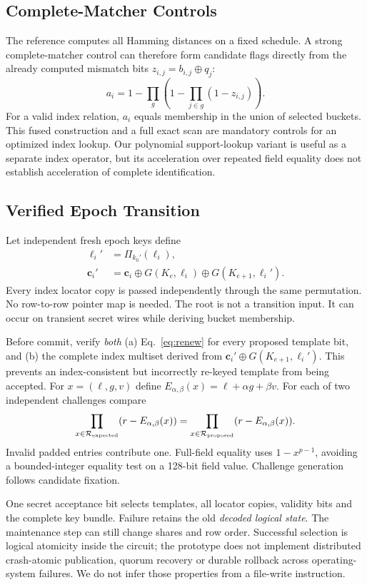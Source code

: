 \documentclass[journal]{IEEEtran}
\begin{document}
\subsection{Complete-Matcher Controls}
The reference computes all Hamming distances on a fixed schedule. A strong complete-matcher control can therefore form candidate flags directly from the already computed mismatch bits $z_{i,j}=b_{i,j}\oplus q_j$:
\[
a_i=1-\prod_g\left(1-\prod_{j\in g}(1-z_{i,j})\right).
\]
For a valid index relation, $a_i$ equals membership in the union of selected buckets. This fused construction and a full exact scan are mandatory controls for an optimized index lookup. Our polynomial support-lookup variant is useful as a separate index operator, but its acceleration over repeated field equality does not establish acceleration of complete identification.

\subsection{Verified Epoch Transition}
Let independent fresh epoch keys define
\begin{align}
\ell_i'&=\Pi_{k_0'}(\ell_i),\\
\mathbf c_i'&=\mathbf c_i\oplus G(K_e,\ell_i)\oplus G(K_{e+1},\ell_i').\label{eq:renew}
\end{align}
Every index locator copy is passed independently through the same permutation. No row-to-row pointer map is needed. The root is not a transition input. It can occur on transient secret wires while deriving bucket membership.

Before commit, verify \emph{both} (a) Eq.~\eqref{eq:renew} for every proposed template bit, and (b) the complete index multiset derived from $\mathbf c_i'\oplus G(K_{e+1},\ell_i')$. This prevents an index-consistent but incorrectly re-keyed template from being accepted. For $x=(\ell,g,v)$ define $E_{\alpha,\beta}(x)=\ell+\alpha g+\beta v$. For each of two independent challenges compare
\begin{equation}
\prod_{x\in\mathcal R_{\rm expected}}(r-E_{\alpha,\beta}(x))
=\prod_{x\in\mathcal R_{\rm proposed}}(r-E_{\alpha,\beta}(x)).
\end{equation}
Invalid padded entries contribute one. Full-field equality uses $1-x^{p-1}$, avoiding a bounded-integer equality test on a 128-bit field value. Challenge generation follows candidate fixation.

One secret acceptance bit selects templates, all locator copies, validity bits and the complete key bundle. Failure retains the old \emph{decoded logical state}. The maintenance step can still change shares and row order. Successful selection is logical atomicity inside the circuit; the prototype does not implement distributed crash-atomic publication, quorum recovery or durable rollback across operating-system failures. We do not infer those properties from a file-write instruction.
\end{document}
